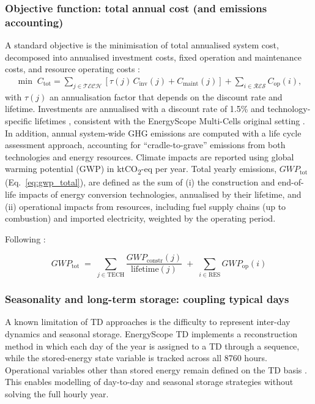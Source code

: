 \documentclass{article}
\begin{document}
\subsubsection{Objective function: total annual cost (and emissions accounting)}
A standard objective is the minimisation of total annualised system cost,
decomposed into annualised investment costs, fixed operation and maintenance costs, and resource operating costs \citep{limpensEnergyScopeTDNovel2019}:
\begin{align}
\min \; C_{\mathrm{tot}}
= \sum_{j \in \mathcal{TECH}} \left[\tau(j)\, C_{\mathrm{inv}}(j) + C_{\mathrm{maint}}(j)\right]
+ \sum_{i \in \mathcal{RES}} C_{\mathrm{op}}(i),
\end{align}
with $\tau(j)$ an annualisation factor that depends on the discount rate and lifetime. Investments are annualised with a discount rate of 1.5\% and technology-specific lifetimes \citep{DanishEnergyAgency2022}, consistent with the EnergyScope Multi-Cells original setting \citep{thiranExploringOptionsFossilfree2025}.
In addition, annual system-wide GHG emissions are computed with a life cycle assessment approach, accounting for “cradle-to-grave” emissions from both technologies and energy resources. Climate impacts are reported using global warming potential (GWP) in ktCO\textsubscript{2}-eq per year. Total yearly emissions, $GWP_{\text{tot}}$ (Eq.~\eqref{eq:gwp_total}), are defined as the sum of (i) the construction and end-of-life impacts of energy conversion technologies, annualised by their lifetime, and (ii) operational impacts from resources, including fuel supply chains (up to combustion) and imported electricity, weighted by the operating period.

Following \citet{limpensEnergyScopeTDNovel2019}:

\begin{equation}
GWP_{\mathrm{tot}} \;=\; \sum_{j \in \mathrm{TECH}} \frac{GWP_{\mathrm{constr}}(j)}{\mathrm{lifetime}(j)} \;+\; \sum_{i \in \mathrm{RES}} GWP_{\mathrm{op}}(i)
\label{eq:gwp_total}
\end{equation}
 


\subsubsection{Seasonality and long-term storage: coupling typical days}
A known limitation of TD approaches is the difficulty to represent inter-day dynamics and seasonal storage. EnergyScope TD implements a reconstruction method in which each day of the year is assigned to a TD through a sequence, while the stored-energy state variable is tracked across all 8760 hours. Operational variables other than stored energy remain defined on the TD basis \citep{limpensGeneratingEnergyTransition2021}. This enables modelling of day-to-day and seasonal storage strategies without solving the full hourly year.
\end{document}
